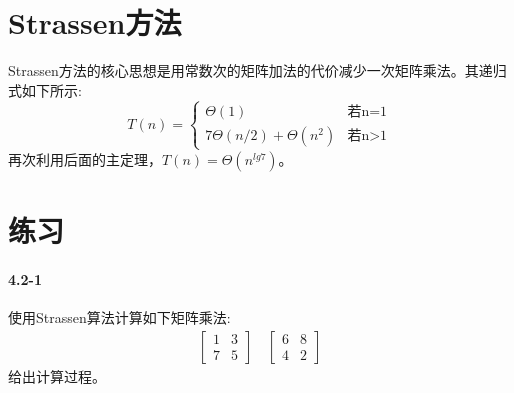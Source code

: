 \documentclass[a4paper,11pt]{article}
\begin{document}
\section*{Strassen方法}
Strassen方法的核心思想是用常数次的矩阵加法的代价减少一次矩阵乘法。其递归式如下所示:
\[
	T(n) = 
	\begin{cases}
		\Theta(1) & \text{若n=1} \\
		7\Theta(n/2) + \Theta(n^2) &\text{若n>1}
	\end{cases}
\]
再次利用后面的主定理，$T(n)=\Theta(n^{lg7})$。
\section*{练习}
\paragraph*{4.2-1}
使用Strassen算法计算如下矩阵乘法:
\[
	\begin{gathered}
		\begin{bmatrix}
			1 & 3\\
			7 & 5
		\end{bmatrix}
		\quad
		\begin{bmatrix}
			6 & 8\\
			4 & 2
		\end{bmatrix}
	\end{gathered}
\]
给出计算过程。\\
\end{document}
